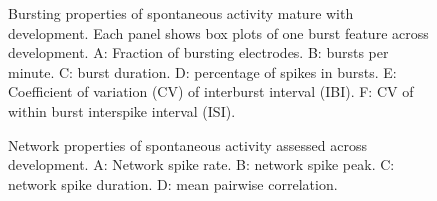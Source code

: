 \documentclass{article}
\begin{document}
\begin{figure}
  \centering
  \caption{Bursting properties of spontaneous activity mature with
    development.  Each panel shows box plots of one burst feature
    across development. A: Fraction of bursting electrodes. B: bursts
    per minute.  C: burst duration.  D: percentage of spikes in
    bursts.  E: Coefficient of variation (CV) of interburst interval
    (IBI).  F: CV of within burst interspike interval (ISI).}
\end{figure}

\begin{figure}
  \centering
  \caption{Network properties of spontaneous activity assessed
    across development.  A: Network spike rate.  B: network spike
    peak.  C: network spike duration. D: mean pairwise correlation.}
\end{figure}
\end{document}
